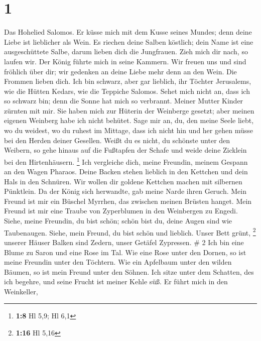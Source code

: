 \hypertarget{section}{%
\section{1}\label{section}}

 Das Hohelied Salomos.  Er küsse mich mit
dem Kusse seines Mundes; denn deine Liebe ist lieblicher als Wein.
 Es riechen deine Salben köstlich; dein Name ist eine
ausgeschüttete Salbe, darum lieben dich die Jungfrauen. 
Zieh mich dir nach, so laufen wir. Der König führte mich in seine
Kammern. Wir freuen uns und sind fröhlich über dir; wir gedenken an
deine Liebe mehr denn an den Wein. Die Frommen lieben dich.
 Ich bin schwarz, aber gar lieblich, ihr Töchter
Jerusalems, wie die Hütten Kedars, wie die Teppiche Salomos.
 Sehet mich nicht an, dass ich so schwarz bin; denn die
Sonne hat mich so verbrannt. Meiner Mutter Kinder zürnten mit mir. Sie
haben mich zur Hüterin der Weinberge gesetzt; aber meinen eigenen
Weinberg habe ich nicht behütet.  Sage mir an, du, den
meine Seele liebt, wo du weidest, wo du ruhest im Mittage, dass ich
nicht hin und her gehen müsse bei den Herden deiner Gesellen.
 Weißt du es nicht, du schönste unter den Weibern, so gehe
hinaus auf die Fußtapfen der Schafe und weide deine Zicklein bei den
Hirtenhäusern. \footnote{\textbf{1:8} Hl 5,9; Hl 6,1}  Ich
vergleiche dich, meine Freundin, meinem Gespann an den Wagen Pharaos.
 Deine Backen stehen lieblich in den Kettchen und dein
Hals in den Schnüren.  Wir wollen dir goldene Kettchen
machen mit silbernen Pünktlein.  Da der König sich
herwandte, gab meine Narde ihren Geruch.  Mein Freund ist
mir ein Büschel Myrrhen, das zwischen meinen Brüsten hanget.
 Mein Freund ist mir eine Traube von Zyperblumen in den
Weinbergen zu Engedi.  Siehe, meine Freundin, du bist
schön; schön bist du, deine Augen sind wie Taubenaugen. 
Siehe, mein Freund, du bist schön und lieblich. Unser Bett grünt,
\footnote{\textbf{1:16} Hl 5,16}  unserer Häuser Balken
sind Zedern, unser Getäfel Zypressen. \# 2  Ich bin eine
Blume zu Saron und eine Rose im Tal.  Wie eine Rose unter
den Dornen, so ist meine Freundin unter den Töchtern.  Wie
ein Apfelbaum unter den wilden Bäumen, so ist mein Freund unter den
Söhnen. Ich sitze unter dem Schatten, des ich begehre, und seine Frucht
ist meiner Kehle süß.  Er führt mich in den Weinkeller,
